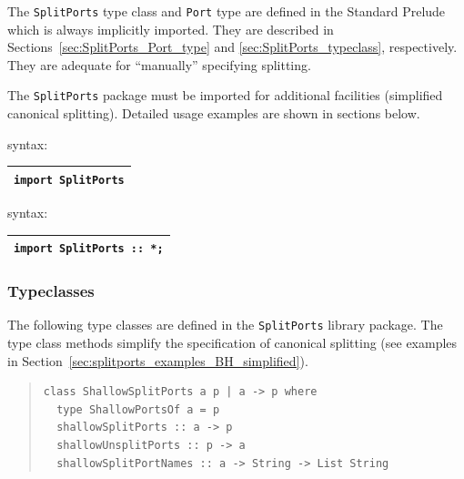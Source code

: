 
The {\tt SplitPorts} type class and {\tt Port} type are defined in the
Standard Prelude which is always implicitly imported.  They are
described in Sections~\ref{sec:SplitPorts_Port_type} and
\ref{sec:SplitPorts_typeclass}, respectively.  They are adequate for
``manually'' specifying splitting.

The {\tt SplitPorts} package must be imported for additional
facilities (simplified canonical splitting). Detailed usage examples
are shown in sections below.

\begin{center}
  \begin{minipage}[t]{0.3\textwidth}
    {\BHb} syntax:

    \begin{tabular}{|l|}
      \hline
      {\tt import SplitPorts} \\
      \hline
    \end{tabular}
  \end{minipage}
  \hspace*{2em}
  \begin{minipage}[t]{0.3\textwidth}
    {\BSVb} syntax:

    \begin{tabular}{|l|}
      \hline
      {\tt import SplitPorts :: *;} \\
      \hline
    \end{tabular}
  \end{minipage}
\end{center}


\subsubsection{Typeclasses}

\label{sec:splitports_shallow_deep}

The following type classes are defined in the {\tt SplitPorts} library
package. The type class methods simplify the specification of
canonical splitting (see examples in
Section~\ref{sec:splitports_examples_BH_simplified}).

\begin{quote}
\begin{verbatim}
class ShallowSplitPorts a p | a -> p where
  type ShallowPortsOf a = p
  shallowSplitPorts :: a -> p
  shallowUnsplitPorts :: p -> a
  shallowSplitPortNames :: a -> String -> List String
\end{verbatim}
\end{quote}


